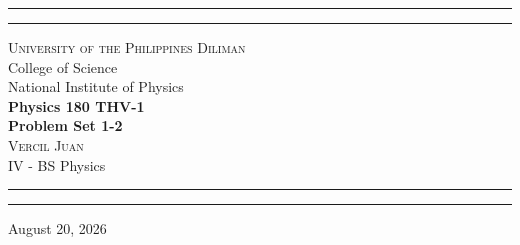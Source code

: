\begin{titlepage}
    \vspace*{2.5in}
    \hrule
    \vspace{3pt}
    \hrule
    \vspace{0.25in}
    \begin{center}
    {\Large \textsc{
		University of the Philippines Diliman}\\[4pt]
		College of Science\\[4pt]
		National Institute of Physics}\\ \vspace{0.5cm}
		{\Huge\textbf{
			Physics 180 THV-1
		\\[5pt]
			Problem Set 1-2
		}}
		\\[0.5cm]
		{\Large \textsc{Vercil Juan}}\\[5pt] {\large IV - BS Physics}
    \end{center}
    \vspace{0.25in}
    \hrule
    \vspace{3pt}
    \hrule 
    \vfill
    \begin{center}
    {\large 
		August 20, 2026
	}
    \end{center}
\end{titlepage}
